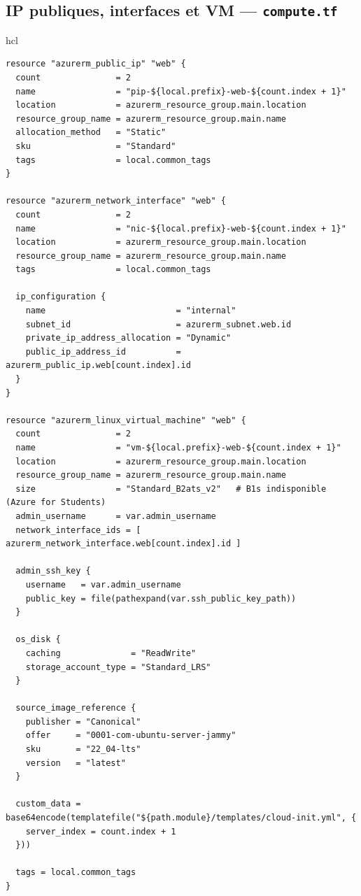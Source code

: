 \documentclass[11pt,a4paper]{article}
\newcommand{\code}[1]{\texttt{#1}}
\begin{document}
\subsection{IP publiques, interfaces et VM — \code{compute.tf}}
\begin{codebox}{hcl}
\begin{Verbatim}
resource "azurerm_public_ip" "web" {
  count               = 2
  name                = "pip-${local.prefix}-web-${count.index + 1}"
  location            = azurerm_resource_group.main.location
  resource_group_name = azurerm_resource_group.main.name
  allocation_method   = "Static"
  sku                 = "Standard"
  tags                = local.common_tags
}

resource "azurerm_network_interface" "web" {
  count               = 2
  name                = "nic-${local.prefix}-web-${count.index + 1}"
  location            = azurerm_resource_group.main.location
  resource_group_name = azurerm_resource_group.main.name
  tags                = local.common_tags

  ip_configuration {
    name                          = "internal"
    subnet_id                     = azurerm_subnet.web.id
    private_ip_address_allocation = "Dynamic"
    public_ip_address_id          = azurerm_public_ip.web[count.index].id
  }
}

resource "azurerm_linux_virtual_machine" "web" {
  count               = 2
  name                = "vm-${local.prefix}-web-${count.index + 1}"
  location            = azurerm_resource_group.main.location
  resource_group_name = azurerm_resource_group.main.name
  size                = "Standard_B2ats_v2"   # B1s indisponible (Azure for Students)
  admin_username      = var.admin_username
  network_interface_ids = [ azurerm_network_interface.web[count.index].id ]

  admin_ssh_key {
    username   = var.admin_username
    public_key = file(pathexpand(var.ssh_public_key_path))
  }

  os_disk {
    caching              = "ReadWrite"
    storage_account_type = "Standard_LRS"
  }

  source_image_reference {
    publisher = "Canonical"
    offer     = "0001-com-ubuntu-server-jammy"
    sku       = "22_04-lts"
    version   = "latest"
  }

  custom_data = base64encode(templatefile("${path.module}/templates/cloud-init.yml", {
    server_index = count.index + 1
  }))

  tags = local.common_tags
}
\end{Verbatim}
\end{codebox}
\end{document}
